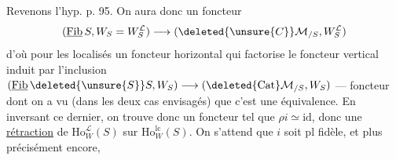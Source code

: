 Revenons  l'hyp. p. 95. On aura donc un foncteur
\[
(\underline{\mathrm{Fib}}\,S,W_S=W_S^{\mathcal L})\longrightarrow(\deleted{\unsure{C}}\mathcal M_{/S},W_S^{\mathcal L})
\]
d'où pour les localisés un foncteur horizontal
qui factorise le foncteur vertical induit par l'inclusion $(\underline{\mathrm{Fib}}\,\deleted{\unsure{S}}S,W_S)\longrightarrow(\deleted{\mathrm{Cat}}\mathcal M_{/S},W_S)$ --- foncteur dont on a vu (dans les deux cas envisagés) que c'est une équivalence.
En inversant ce dernier,  on trouve donc un foncteur
\margin{\unsure{*}}
tel que $\rho i\simeq\mathrm{id}$, donc une \uline{rétraction} de $\mathrm{Ho}^{\mathcal L}_W(S)$ sur $\mathrm{Ho}^{\mathrm{lc}}_W(S)$. On s'attend que $i$ soit pl fidèle, et plus précisément encore,

